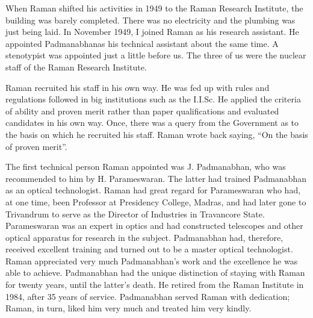 When Raman shifted his activities in 1949 to the Raman
Research Institute, the building was barely completed. There
was no electricity and the plumbing was just being laid.
In November 1949, I joined Raman as his research assistant.
He appointed \hbox{Padmanabhan}\break as his technical assistant about the
same time. A stenotypist was appointed just a little before
us. The three of us were the nuclear staff of the Raman
Research Institute.

Raman recruited his staff in his own way. He was fed up
with rules and regulations followed in big institutions such as the
I.I.Sc. He applied the criteria of ability and proven merit rather
than paper qualifications and evaluated candidates in his own
way. Once, there was a query from the Government as to the
basis on which he recruited his staff. Raman wrote back saying,
``On the basis of proven merit''.

The first technical person Raman appointed was J. Padmanabhan, who was recommended to him by
 H. Parameswaran. The latter had trained Padmanabhan as an optical technologist.
Raman had great regard for Parameswaran who had, at one time,
been Professor at Presidency College, Madras, and had later gone
to Trivandrum to serve as the Director of Industries in Travancore
State. Parameswaran was an expert in optics and had constructed
telescopes and other optical apparatus for research in the subject.
Padmanabhan had, therefore, received excellent training and
turned out to be a master optical technologist. Raman appreciated
very much Padmanabhan's work and the excellence he was able
to achieve. Padmanabhan had the unique distinction of staying
with Raman for twenty years, until the latter's death. He retired
from the Raman Institute in 1984, after 35 years of service.
Padmanabhan served Raman with dedication; Raman, in turn,
liked him very much and treated him very kindly.

